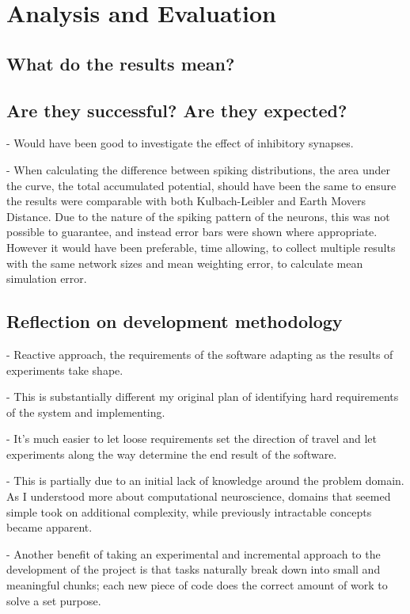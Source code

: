 \chapter{Analysis and Evaluation}

\section{What do the results mean?}

\section{Are they successful? Are they expected?}

- Would have been good to investigate the effect of inhibitory synapses.

- When calculating the difference between spiking distributions, the area under the curve, the total accumulated potential, should have been the same to ensure the results were comparable with both Kulbach-Leibler and Earth Movers Distance. Due to the nature of the spiking pattern of the neurons, this was not possible to guarantee, and instead error bars were shown where appropriate. However it would have been preferable, time allowing, to collect multiple results with the same network sizes and mean weighting error, to calculate mean simulation error.

\section{Reflection on development methodology}

 - Reactive approach, the requirements of the software adapting as the results
 of experiments take shape.

 - This is substantially different my original plan of identifying hard
 requirements of the system and implementing. 

 - It's much easier to let loose requirements set the direction of travel and
 let experiments along the way determine the end result of the software.

 - This is partially due to an initial lack of knowledge around the problem
 domain. As I understood more about computational neuroscience, domains that
 seemed simple took on additional complexity, while previously intractable
 concepts became apparent.

- Another benefit of taking an experimental and incremental approach to the
development of the project is that tasks naturally break down into small and
meaningful chunks; each new piece of code does the correct amount of work to
solve a set purpose.

